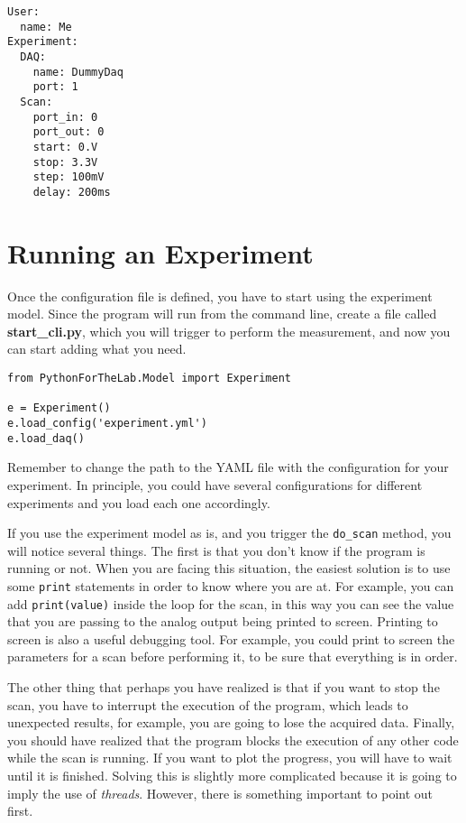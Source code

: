 \begin{verbatim}
User:
  name: Me
Experiment:
  DAQ:
    name: DummyDaq
    port: 1
  Scan:
    port_in: 0
    port_out: 0
    start: 0.V
    stop: 3.3V
    step: 100mV
    delay: 200ms
\end{verbatim}

\section{Running an Experiment}\label{running-anexperiment}
Once the configuration file is defined, you have to start using the
experiment model. Since the program will run from the command line,
create a file called \textbf{start\_cli.py}, which you will trigger to
perform the measurement, and now you can start adding what you need.

\begin{verbatim}
from PythonForTheLab.Model import Experiment

e = Experiment()
e.load_config('experiment.yml')
e.load_daq()
\end{verbatim}

Remember to change the path to the {YAML} file with the configuration
for your experiment. In principle, you could have several configurations
for different experiments and you load each one accordingly.


If you use the experiment model as is, and you trigger the
\texttt{do_scan} method, you will notice several things. The first is
that you don't know if the program is running or not. When you are
facing this situation, the easiest solution is to use some
\texttt{print} statements in order to know where you are at. For
example, you can add \texttt{print(value)} inside the loop for the scan,
in this way you can see the value that you are passing to the analog
output being printed to screen. Printing to screen is also a useful
debugging tool. For example, you could print to screen the parameters
for a scan before performing it, to be sure that everything is in order.

The other thing that perhaps you have realized is that if you want to
stop the scan, you have to interrupt the execution of the program, which
leads to unexpected results, for example, you are going to lose the
acquired data. Finally, you should have realized that the program blocks
the execution of any other code while the scan is running. If you want
to plot the progress, you will have to wait until it is finished.
Solving this is slightly more complicated because it is going to imply
the use of \emph{threads}. However, there is something important to
point out first.

